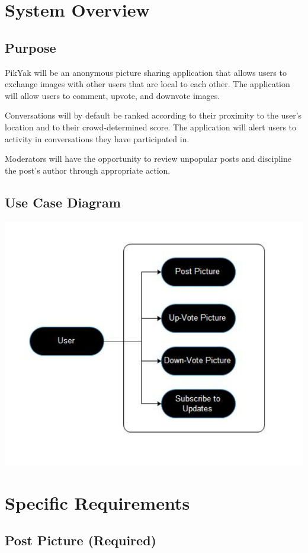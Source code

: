 \documentclass[11pt]{scrartcl}
\let\stdsection\section
\renewcommand\section{\newpage\stdsection}
\begin{document}
\section{System Overview}
    \subsection{Purpose}
        PikYak will be an anonymous picture sharing application that allows users to exchange images with other users that are local to each other.  The application will allow users to comment, upvote, and downvote images.

        Conversations will by default be ranked according to their proximity to the user's location and to their crowd-determined score.  The application will alert users to activity in conversations they have participated in.

        Moderators will have the opportunity to review unpopular posts and discipline the post's author through appropriate action.
    \subsection{Use Case Diagram}
        \includegraphics{useCase}

\section{Specific Requirements}
    \subsection{Post Picture (Required)}
    \label{sec:post}
\end{document}
